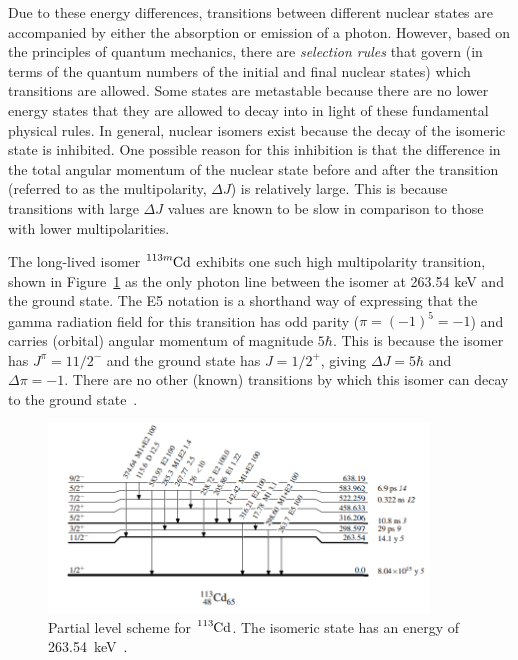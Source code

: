 \documentclass[12pt,a4paper]{article}
\begin{document}
\medskip
Due to these energy differences, transitions between different nuclear states are accompanied by either the absorption or emission of a photon. However, based on the principles of quantum mechanics, there are \textit{selection rules} that govern (in terms of the quantum numbers of the initial and final nuclear states) which transitions are allowed.
Some states are metastable because there are no lower energy states that they are allowed to decay into in light of these fundamental physical rules.
In general, nuclear isomers exist because the decay of the isomeric state is inhibited. 
One possible reason for this inhibition is that the difference in the total angular momentum of the nuclear state before and after the transition (referred to as the multipolarity, $\Delta J$) is relatively large.
This is because transitions with large $\Delta J$ values are known to be slow in comparison to those with lower multipolarities.

\medskip
The long-lived isomer $\ce{^{113m}Cd}$ exhibits one such high multipolarity transition, shown in Figure~\ref{fig:cd113} as the only photon line between the isomer at 263.54 keV and the ground state.
The E5 notation is a shorthand way of expressing that the gamma radiation field for this transition has odd parity ($\pi = (-1)^5  = -1$) and carries (orbital) angular momentum of magnitude $5\hbar$. This is because the isomer has $J^\pi = 11/2^-$ and the ground state has $J = 1/2^+$, giving $\Delta J = 5\hbar$ and $\Delta \pi = -1$.
There are no other (known) transitions by which this isomer can decay to the ground state~\cite{j._blachot_nucl._data_sheets_111_1471_2010_data_extracted_from_the_ensdf_database_revision_of_june_2010._notitle_nodate}.

\begin{figure}
	\centering
	\includegraphics[width=0.9\textwidth]{113cd_partial_level_scheme_ENSDF.png}
	\caption{Partial level scheme for $\ce{^{113}Cd}$. The isomeric state has an energy of 263.54~keV~\cite{j._blachot_nucl._data_sheets_111_1471_2010_data_extracted_from_the_ensdf_database_revision_of_june_2010._notitle_nodate}.}
	\label{fig:cd113}
\end{figure}
\end{document}
